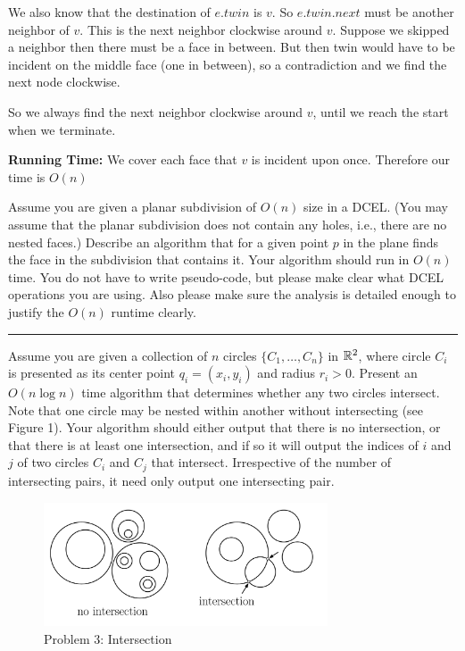 \documentclass[11pt]{article}
\begin{document}
We also know that the destination of $e.twin$ is $v$. So $e.twin.next$ must be another neighbor of $v$.
This is the next neighbor clockwise around $v$. Suppose we skipped a neighbor then there must be a face in between.
But then twin would have to be incident on the middle face (one in between), so a contradiction and we find the next node clockwise.

So we always find the next neighbor clockwise around $v$, until we reach the start when we terminate.

\textbf{Running Time:} We cover each face that $v$ is incident upon once. Therefore our time is $O(n)$





Assume you are given a planar subdivision of $O(n)$ size in a DCEL. (You may
assume that the planar subdivision does not contain any holes, i.e., there are
no nested faces.) Describe an algorithm that for a given point $p$ in the plane
finds the face in the subdivision that contains it. Your algorithm should run in
$O(n)$ time. You do not have to write pseudo-code, but please make clear what
DCEL operations you are using. Also please make sure the analysis is detailed
enough to justify the $O(n)$ runtime clearly.

\hrule










Assume you are given a collection of $n$ circles $\{C_1 , \ldots , C_n \}$ in
$\mathbb{R}^2$, where circle $C_i$ is presented as its center point $q_i = (x_i, y_i)$
and radius $r_i > 0$. Present an $O(n \log n)$ time algorithm that determines
whether any two circles intersect. Note that one circle may be nested within
another without intersecting (see Figure 1). Your algorithm should either output
that there is no intersection, or that there is at least one intersection, and
if so it will output the indices of $i$ and $j$ of two circles $C_i$ and $C_j$
that intersect. Irrespective of the number of intersecting pairs, it need only
output one intersecting pair.

\begin{figure}[h]
    \centering
    \includegraphics[width=0.75\textwidth]{intersection}
    \caption{Problem 3: Intersection}
\end{figure}
\end{document}
